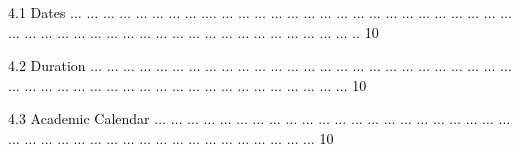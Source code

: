 \documentclass[12pt]{article}
\begin{document}
\vspace{\baselineskip}
\begin{adjustwidth}{0.21in}{0.0in}
{\fontsize{7pt}{8.4pt}\selectfont \textcolor[HTML]{00000A}{4.1 Dates $ \ldots $ $ \ldots $ $ \ldots $ $ \ldots $ $ \ldots $ $ \ldots $ $ \ldots $ $ \ldots $ .$ \ldots $ $ \ldots $ $ \ldots $ $ \ldots $ $ \ldots $ $ \ldots $ $ \ldots $ $ \ldots $ $ \ldots $ $ \ldots $ $ \ldots $ $ \ldots $ $ \ldots $ $ \ldots $ $ \ldots $ $ \ldots $ $ \ldots $ $ \ldots $ $ \ldots $ $ \ldots $ $ \ldots $ $ \ldots $ $ \ldots $ $ \ldots $ $ \ldots $ $ \ldots $ $ \ldots $ $ \ldots $ $ \ldots $ $ \ldots $ $ \ldots $ $ \ldots $ $ \ldots $ $ \ldots $ $ \ldots $ $ \ldots $ $ \ldots $ $ \ldots $ $ \ldots $ $ \ldots $ .. 10}\par}\par

\end{adjustwidth}


\vspace{\baselineskip}
\begin{adjustwidth}{0.21in}{0.0in}
{\fontsize{7pt}{8.4pt}\selectfont \textcolor[HTML]{00000A}{4.2 Duration $ \ldots $ $ \ldots $ $ \ldots $ $ \ldots $ $ \ldots $ $ \ldots $ $ \ldots $ $ \ldots $ $ \ldots $ $ \ldots $ $ \ldots $ $ \ldots $ $ \ldots $ $ \ldots $ $ \ldots $ $ \ldots $ $ \ldots $ $ \ldots $ $ \ldots $ $ \ldots $ $ \ldots $ $ \ldots $ $ \ldots $ $ \ldots $ $ \ldots $ $ \ldots $ $ \ldots $ $ \ldots $ $ \ldots $ $ \ldots $ $ \ldots $ $ \ldots $ $ \ldots $ $ \ldots $ $ \ldots $ $ \ldots $ $ \ldots $ $ \ldots $ $ \ldots $ $ \ldots $ $ \ldots $ $ \ldots $ $ \ldots $ $ \ldots $ $ \ldots $ $ \ldots $ $ \ldots $  10}\par}\par

\end{adjustwidth}


\vspace{\baselineskip}
\begin{adjustwidth}{0.21in}{0.0in}
{\fontsize{7pt}{8.4pt}\selectfont \textcolor[HTML]{00000A}{4.3 Academic Calendar $ \ldots $ $ \ldots $ $ \ldots $ $ \ldots $ $ \ldots $ $ \ldots $ $ \ldots $ $ \ldots $ $ \ldots $ $ \ldots $ $ \ldots $ $ \ldots $ $ \ldots $ $ \ldots $ $ \ldots $ $ \ldots $ $ \ldots $ $ \ldots $ $ \ldots $ $ \ldots $ $ \ldots $ $ \ldots $ $ \ldots $ $ \ldots $ $ \ldots $ $ \ldots $ $ \ldots $ $ \ldots $ $ \ldots $ $ \ldots $ $ \ldots $ $ \ldots $ $ \ldots $ $ \ldots $ $ \ldots $ $ \ldots $ $ \ldots $ $ \ldots $ $ \ldots $ $ \ldots $ $ \ldots $  10}\par}\par

\end{adjustwidth}
\end{document}
